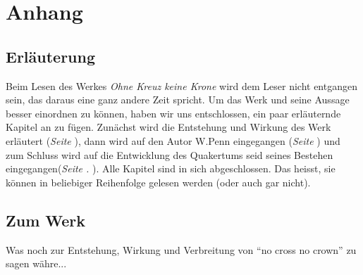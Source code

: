 \documentclass[a5paper,pagesize,9pt]{scrbook}
\begin{document}
\backmatter
\part{Anhang}
\chapter{Erläuterung}

Beim Lesen des Werkes \textit{Ohne Kreuz keine Krone} wird dem Leser nicht
entgangen sein, das daraus eine ganz andere Zeit spricht. Um das Werk und seine
Aussage besser einordnen zu können, haben wir uns entschlossen, ein paar
erläuternde Kapitel an zu fügen. Zunächst wird die Entstehung und Wirkung des
Werk erläutert (\textit{Seite \pageref{ref:zum_werk}}), dann wird auf den Autor
W.Penn eingegangen (\textit{Seite \pageref{ref:zum_autor_penn}}) und zum Schluss
wird auf die Entwicklung des Quakertums seid seines Bestehen
eingegangen(\textit{Seite . \pageref{ref:entwiklung_quakertum}}). Alle Kapitel
sind in sich abgeschlossen. Das heisst, sie können in beliebiger Reihenfolge
gelesen werden (oder auch gar nicht).

\chapter{Zum Werk}\label{ref:zum_werk}

Was noch zur Entstehung, Wirkung und Verbreitung von "`no cross no crown"' zu
sagen währe...





\printindex
\end{document}
